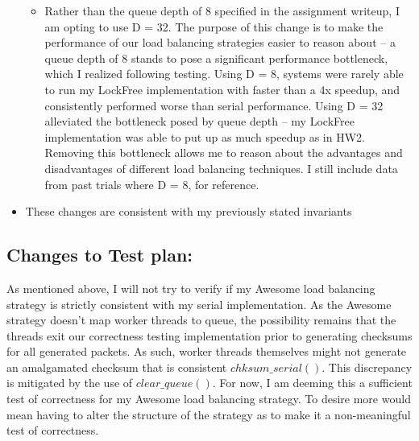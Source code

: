 \documentclass[]{article}
\begin{document}
\begin{itemize}
\begin{itemize}
		\item Rather than the queue depth of 8 specified in the assignment writeup, I am opting to use D = 32. The purpose of this change is to make the performance of our load balancing strategies easier to reason about -- a queue depth of 8 stands to pose a significant performance bottleneck, which I realized following testing. Using D = 8, systems were rarely able to run my LockFree implementation with faster than a 4x speedup, and consistently performed worse than serial performance. Using D = 32 alleviated the bottleneck posed by queue depth -- my LockFree implementation was able to put up as much speedup as in HW2. Removing this bottleneck allows me to reason about the advantages and disadvantages of different load balancing techniques. I still include data from past trials where D = 8, for reference.
	\end{itemize}
	\item These changes are consistent with my previously stated invariants
\end{itemize}

\subsection{Changes to Test plan:}
As mentioned above, I will not try to verify if my Awesome load balancing strategy is strictly consistent with my serial implementation. As the Awesome strategy doesn't map worker threads to queue, the possibility remains that the threads exit our correctness testing implementation prior to generating checksums for all generated packets. As such, worker threads themselves might not generate an amalgamated checksum that is consistent $chksum\_serial()$. This discrepancy is mitigated by the use of $clear\_queue()$. For now, I am deeming this a sufficient test of correctness for my Awesome load balancing strategy. To desire more would mean having to alter the structure of the strategy as to make it a non-meaningful test of correctness.
\end{document}
